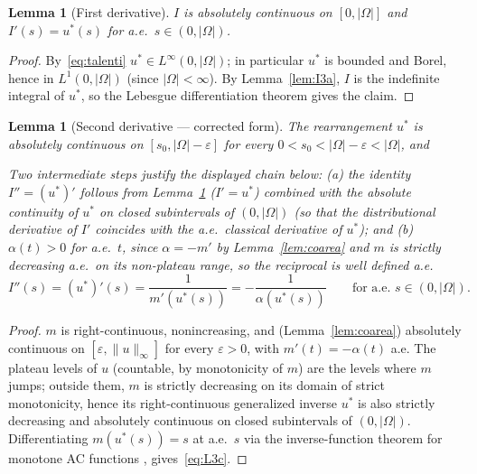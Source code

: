 \documentclass[11pt]{article}
\newtheorem{lemma}[theorem]{Lemma}
\theoremstyle{definition}
\newcommand{\Om}{\Omega}
\newcommand{\eps}{\varepsilon}
\begin{document}
\begin{lemma}[First derivative]\label{lem:I3b}
$I$ is absolutely continuous on $[0,|\Om|]$ and $I'(s)=u^{*}(s)$ for
a.e.\ $s\in(0,|\Om|)$.
\end{lemma}

\begin{proof}
By~\eqref{eq:talenti} $u^{*}\in L^{\infty}(0,|\Om|)$; in particular
$u^{*}$ is bounded and Borel, hence in $L^{1}(0,|\Om|)$ (since
$|\Om|<\infty$). By
Lemma~\ref{lem:I3a}, $I$ is the indefinite integral of $u^{*}$, so the
Lebesgue differentiation theorem gives the claim.
\end{proof}

\begin{lemma}[Second derivative --- corrected form]\label{lem:I3c}
The rearrangement $u^{*}$ is absolutely continuous on
$[s_{0},|\Om|-\eps]$ for every $0<s_{0}<|\Om|-\eps<|\Om|$, and

Two intermediate steps justify the displayed chain below: (a) the
identity $I''=(u^{*})'$ follows from Lemma~\ref{lem:I3b}
($I'=u^{*}$) combined with the absolute continuity of $u^{*}$ on
closed subintervals of $(0,|\Om|)$ (so that the distributional
derivative of $I'$ coincides with the a.e.\ classical derivative of
$u^{*}$); and (b) $\alpha(t)>0$ for a.e.\ $t$, since $\alpha=-m'$
by Lemma~\ref{lem:coarea} and $m$ is strictly decreasing a.e.\ on
its non-plateau range, so the reciprocal is well defined a.e.
\begin{equation}\label{eq:L3c}
   I''(s)=(u^{*})'(s)
   =\frac{1}{m'(u^{*}(s))}
   =-\frac{1}{\alpha(u^{*}(s))}
   \qquad\text{for a.e.\ }s\in(0,|\Om|).
\end{equation}
\end{lemma}

\begin{proof}
$m$ is right-continuous, nonincreasing, and (Lemma~\ref{lem:coarea})
absolutely continuous on $[\eps,\|u\|_{\infty}]$ for every $\eps>0$,
with $m'(t)=-\alpha(t)$ a.e. The plateau levels of $u$ (countable, by
monotonicity of $m$) are the levels where $m$ jumps; outside them, $m$
is strictly decreasing on its domain of strict monotonicity, hence its
right-continuous generalized inverse $u^{*}$ is also strictly
decreasing and absolutely continuous on closed subintervals of
$(0,|\Om|)$. Differentiating $m(u^{*}(s))=s$ at a.e.\ $s$ via the
inverse-function theorem for monotone AC functions \cite[Thm.~3.99]{AFP2000},
\cite{BBC1975} gives~\eqref{eq:L3c}.
\end{proof}
\end{document}
